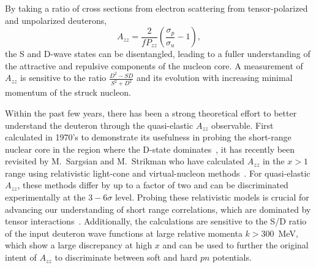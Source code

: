 By taking a ratio of cross sections from electron scattering from tensor-polarized and unpolarized deuterons, 
\begin{equation}
A_{zz}=\frac{2}{fP_{zz}}\left(\frac{\sigma_p}{\sigma_u}-1\right),
\end{equation}
the S and D-wave states can be disentangled, leading to a fuller understanding of the attractive and repulsive components of the nucleon core. A measurement of $A_{zz}$ is sensitive to the ratio $\frac{D^2-SD}{S^2+D^2}$ and its evolution with increasing minimal momentum of the struck nucleon. 

Within the past few years, there has been a strong theoretical effort to better understand the deuteron through the quasi-elastic $A_{zz}$ observable. First calculated in 1970's to demonstrate its usefulness in probing the short-range nuclear core in the region where the D-state dominates~\cite{Frankfurt:1988nt}, it has recently been revisited by M.~Sargsian and M.~Strikman who have calculated $A_{zz}$ in the $x > 1$ range using relativistic light-cone and virtual-nucleon methods~\cite{Sargsian:2014fla}. For quasi-elastic $A_{zz}$, these methods differ by up to a factor of two and can be discriminated experimentally at the $3-6\sigma$ level. Probing these relativistic models is crucial for advancing our understanding of short range correlations, which are dominated by tensor interactions~\cite{Korover:2014dma}. Additionally, the calculations are sensitive to the S/D ratio of the input deuteron wave functions at large relative momenta $k>300$~MeV, which show a large discrepancy at high $x$ and can be used to further the original intent of $A_{zz}$ to discriminate between soft and hard $pn$ potentials. 




